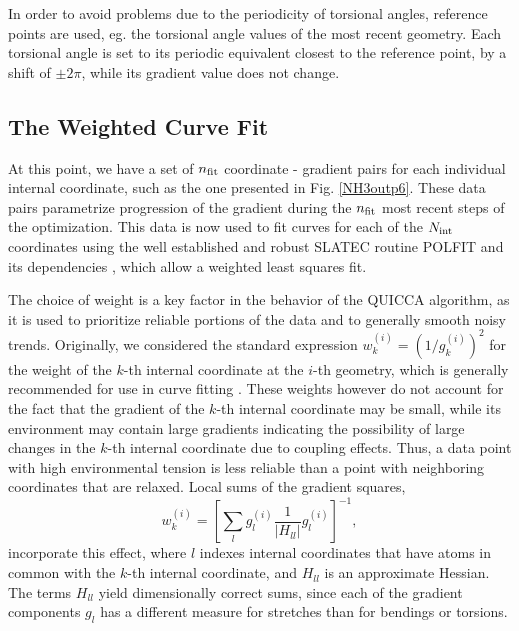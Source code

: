 \documentclass[prl,twocolumn,showpacs,twocolumngrid,superbib]{revtex4}
\begin{document}
In order to avoid problems due to the periodicity of torsional angles, reference points are used, 
eg. the torsional angle values of the most recent geometry. Each torsional angle is set to its 
periodic equivalent closest to the reference point, by a shift of $\pm 2\pi$, while its gradient value does not change.

\subsection{The Weighted Curve Fit} \label{Sweights}

At this point,  we have a set of $n_{\rm fit}$ coordinate - gradient pairs for each individual 
internal coordinate, such as the one presented in Fig. \ref{NH3outp6}. These data 
pairs parametrize progression of the gradient during the $n_{\rm fit}$ most recent steps of the 
optimization.  This data is now used to fit curves for each of the $N_{\rm int}$ coordinates using the 
well established and robust {\sc SLATEC} routine {\sc POLFIT} and its dependencies \cite{slatec}, 
which allow a weighted least squares fit.

The choice of weight is a key factor in the behavior of the QUICCA algorithm, as it is used to prioritize 
reliable portions of the data and to generally smooth noisy trends.  
Originally, we considered the standard expression $w_{k}^{(i)}=\left(1/{g_{k}^{(i)}}\right)^2$ for the weight 
of the $k$-th internal coordinate at the $i$-th geometry, which is generally recommended for use in curve 
fitting \cite{numerical_recipies}.  These weights however do not 
account for the fact that the gradient of the $k$-th internal coordinate may be small, while 
its environment may contain large gradients indicating the possibility of large changes in the $k$-th 
internal coordinate due to coupling effects.  Thus, a data point with high environmental tension 
is less reliable than a point with neighboring coordinates that are relaxed.   
Local sums of the gradient squares,
\begin{equation}
\label{weights}
w_{k}^{(i)} = \left[ \sum_{l} g_{l}^{(i)} \frac{1}{|H_{ll}^{}|} g_{l}^{(i)} \right]^{-1} ,
\end{equation}
incorporate this effect, where  $l$ indexes internal coordinates that have atoms in common with 
the $k$-th internal coordinate, and $H_{ll}^{}$ is an approximate Hessian.  The terms 
$H_{ll}^{}$ yield dimensionally correct sums, since each of the gradient components  $g_{l}$ has a 
different measure for stretches than for bendings or torsions.  
\end{document}
